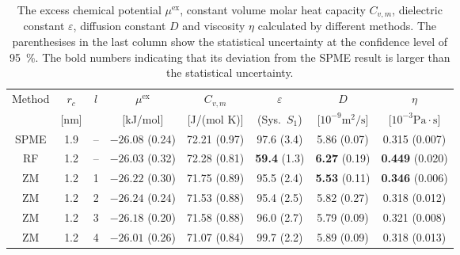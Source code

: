 \documentclass[aip,jcp,a4paper,reprint,unsortedaddress,onecolumn,fleqn]{revtex4-1}
\newcommand{\eps}{\varepsilon}
\newcommand{\exc}{\textrm{ex}}
\newcommand{\systemsb}{S_1}
\begin{document}
\begin{table}
  \centering
  \caption{The excess chemical potential $\mu^\exc$, constant volume molar heat capacity $C_{v,m}$, dielectric constant $\eps$, diffusion constant $D$ and viscosity $\eta$
    calculated by different methods.    
    The parenthesises in the last column show the statistical uncertainty
    at the confidence level of 95~\%.
    The bold numbers indicating that its deviation from the SPME result is larger than the statistical uncertainty.
  }
  \begin{tabular*}{0.9\textwidth}{@{\extracolsep{\fill}}ccc ccccc}\hline\hline
    Method      &   $r_c$ &    $l$      & $\mu^\exc$  &$C_{v,m}$ &  $\eps$ & $D$ &  $\eta$ \\
                &    [nm] &             &   [kJ/mol] &[J/(mol K)] & (Sys.~$\systemsb$) & [$10^{-9}\textrm{m}^2/\textrm{s}$] &  [$10^{-3}\textrm{Pa}\cdot\textrm{s}$] \\\hline
    SPME        &         1.9     &       --      &      $-26.08$ (0.24) & 72.21 (0.97)  & 97.6 (3.4)  & 5.86 (0.07)   & 0.315 (0.007)\\
    RF          &         1.2     & --            &      $-26.03$ (0.32) & 72.28 (0.81)  & \textbf{59.4} (1.3)  & \textbf{6.27} (0.19)   & \textbf{0.449} (0.020)\\
    ZM          &         1.2     &       1       &      $-26.22$ (0.30) & 71.75 (0.89)  & 95.5 (2.4)  & \textbf{5.53} (0.11)   & \textbf{0.346} (0.006)\\ 
    ZM          &         1.2     &       2       &      $-26.24$ (0.24) & 71.53 (0.88)  & 95.4 (2.5)  & 5.82 (0.27)   & 0.318 (0.012)\\ 
    ZM          &         1.2     &       3       &      $-{26.18}$ (0.20) & 71.58 (0.88)  & 96.0 (2.7)  & 5.79 (0.09)   & 0.321 (0.008)\\ 
    ZM          &         1.2     &       4       &      $-{26.01}$ (0.26) & 71.07 (0.84)  & 99.7 (2.2)  & 5.89 (0.09)   & 0.318 (0.013)\\
    \hline\hline
  \end{tabular*}
  \label{tab:tmp3}
\end{table}
\end{document}

